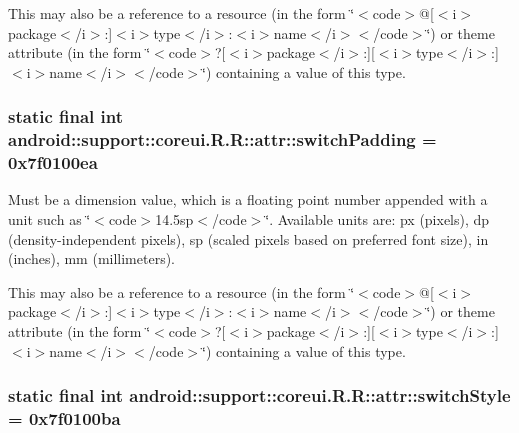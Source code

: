 This may also be a reference to a resource (in the form \char`\"{}$<$code$>$@\mbox{[}$<$i$>$package$<$/i$>$:\mbox{]}$<$i$>$type$<$/i$>$:$<$i$>$name$<$/i$>$$<$/code$>$\char`\"{}) or theme attribute (in the form \char`\"{}$<$code$>$?\mbox{[}$<$i$>$package$<$/i$>$:\mbox{]}\mbox{[}$<$i$>$type$<$/i$>$:\mbox{]}$<$i$>$name$<$/i$>$$<$/code$>$\char`\"{}) containing a value of this type. \hypertarget{classandroid_1_1support_1_1coreui_1_1_r_1_1attr_cb964b1df7d0fb246724a0c25d5ae591}{
\subsubsection[{switchPadding}]{\setlength{\rightskip}{0pt plus 5cm}static final int android::support::coreui.R.R::attr::switchPadding = 0x7f0100ea}}
\label{classandroid_1_1support_1_1coreui_1_1_r_1_1attr_cb964b1df7d0fb246724a0c25d5ae591}


Must be a dimension value, which is a floating point number appended with a unit such as \char`\"{}$<$code$>$14.5sp$<$/code$>$\char`\"{}. Available units are: px (pixels), dp (density-independent pixels), sp (scaled pixels based on preferred font size), in (inches), mm (millimeters). 

This may also be a reference to a resource (in the form \char`\"{}$<$code$>$@\mbox{[}$<$i$>$package$<$/i$>$:\mbox{]}$<$i$>$type$<$/i$>$:$<$i$>$name$<$/i$>$$<$/code$>$\char`\"{}) or theme attribute (in the form \char`\"{}$<$code$>$?\mbox{[}$<$i$>$package$<$/i$>$:\mbox{]}\mbox{[}$<$i$>$type$<$/i$>$:\mbox{]}$<$i$>$name$<$/i$>$$<$/code$>$\char`\"{}) containing a value of this type. \hypertarget{classandroid_1_1support_1_1coreui_1_1_r_1_1attr_d58b61534e08f370020de39f0e9b6850}{
\subsubsection[{switchStyle}]{\setlength{\rightskip}{0pt plus 5cm}static final int android::support::coreui.R.R::attr::switchStyle = 0x7f0100ba}}
\label{classandroid_1_1support_1_1coreui_1_1_r_1_1attr_d58b61534e08f370020de39f0e9b6850}


